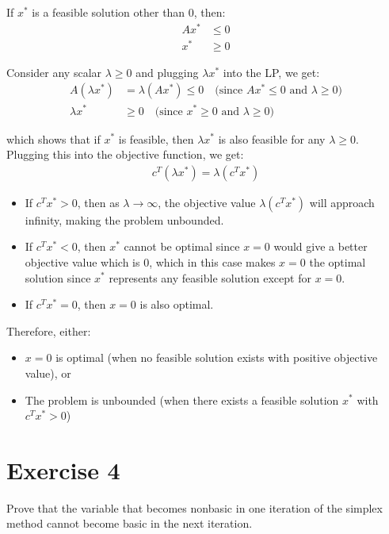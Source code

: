 \documentclass{article}
\begin{document}
If $x^*$ is a feasible solution other than 0, then:
\begin{align*}
Ax^* &\leq 0 \\
x^* &\geq 0
\end{align*}

Consider any scalar $\lambda \geq 0$ and plugging $\lambda x^*$ into the LP, we get:
\begin{align*}
A(\lambda x^*) &= \lambda(Ax^*) \leq 0 \quad \text{(since $Ax^* \leq 0$ and $\lambda \geq 0$)} \\
\lambda x^* &\geq 0 \quad \text{(since $x^* \geq 0$ and $\lambda \geq 0$)}
\end{align*}

which shows that if $x^*$ is feasible, then $\lambda x^*$ is also feasible for any $\lambda \geq 0$. \\

Plugging this into the objective function, we get:
\begin{align*}
c^T(\lambda x^*) = \lambda(c^T x^*)
\end{align*}

\begin{itemize}
\item If $c^T x^* > 0$, then as $\lambda \to \infty$, the objective value $\lambda(c^T x^*)$ will approach infinity, making the problem unbounded.
\item If $c^T x^* < 0$, then $x^*$ cannot be optimal since $x = 0$ would give a better objective value which is 0, which in this case makes $x = 0$ the optimal solution since $x^*$ represents any feasible solution except for $x = 0$.
\item If $c^T x^* = 0$, then $x = 0$ is also optimal.
\end{itemize}

Therefore, either:
\begin{itemize}
\item $x = 0$ is optimal (when no feasible solution exists with positive objective value), or
\item The problem is unbounded (when there exists a feasible solution $x^*$ with $c^T x^* > 0$)
\end{itemize}

\newpage

\section*{Exercise 4}
Prove that the variable that becomes nonbasic in one iteration of the simplex method cannot become basic in the next iteration. \\
\end{document}
